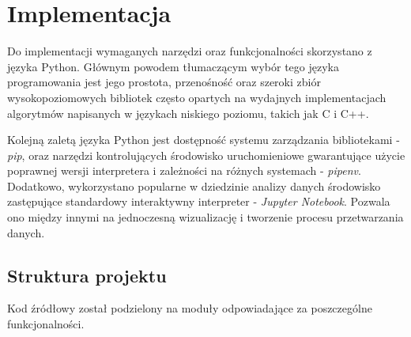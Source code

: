 \chapter{Implementacja}\label{chap:impl}
{
    Do implementacji wymaganych narzędzi oraz funkcjonalności skorzystano z języka Python. Głównym powodem tłumaczącym wybór tego języka programowania jest jego prostota, przenośność oraz szeroki zbiór wysokopoziomowych bibliotek często opartych na wydajnych implementacjach algorytmów napisanych w językach niskiego poziomu, takich jak C i C++. 

    Kolejną zaletą języka Python jest dostępność systemu zarządzania bibliotekami - {\textit {{pip}}}, oraz narzędzi kontrolujących środowisko uruchomieniowe gwarantujące użycie poprawnej wersji interpretera i zależności na różnych systemach - {\textit {{pipenv}}}. Dodatkowo, wykorzystano popularne w dziedzinie analizy danych środowisko zastępujące standardowy interaktywny interpreter - {\textit {Jupyter Notebook}}. Pozwala ono między innymi na jednoczesną wizualizację i tworzenie procesu przetwarzania danych. 

    \section{Struktura projektu}
    {
        Kod źródłowy został podzielony na moduły odpowiadające za poszczególne funkcjonalności. 

}}
